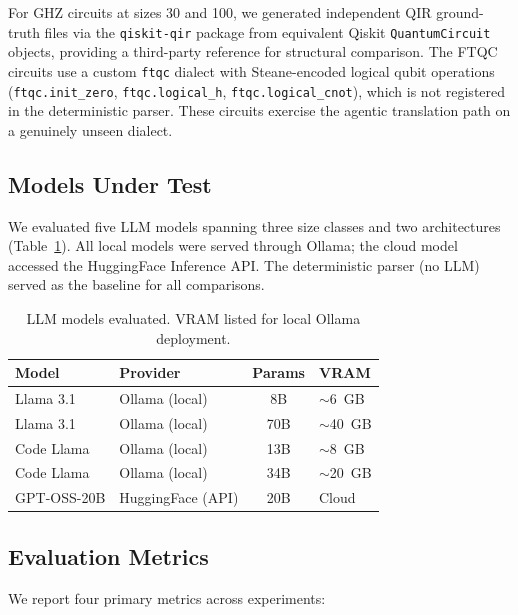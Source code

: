 \documentclass[conference]{IEEEtran}
\begin{document}
For GHZ circuits at sizes 30 and 100, we generated independent QIR ground-truth files via the \texttt{qiskit-qir} package from equivalent Qiskit \texttt{QuantumCircuit} objects, providing a third-party reference for structural comparison. The FTQC circuits use a custom \texttt{ftqc} dialect with Steane-encoded logical qubit operations (\texttt{ftqc.init\_zero}, \texttt{ftqc.logical\_h}, \texttt{ftqc.logical\_cnot}), which is not registered in the deterministic parser. These circuits exercise the agentic translation path on a genuinely unseen dialect.


\subsection{Models Under Test}

We evaluated five LLM models spanning three size classes and two architectures (Table~\ref{tab:models}). All local models were served through Ollama; the cloud model accessed the HuggingFace Inference API. The deterministic parser (no LLM) served as the baseline for all comparisons.

\begin{table}[htbp]
\centering
\caption{LLM models evaluated. VRAM listed for local Ollama deployment.}
\label{tab:models}
\renewcommand{\arraystretch}{1.1}
\begin{tabular}{@{}llcl@{}}
\toprule
\textbf{Model} & \textbf{Provider} & \textbf{Params} & \textbf{VRAM} \\
\midrule
Llama 3.1      & Ollama (local)     & 8B   & $\sim$6~GB  \\
Llama 3.1      & Ollama (local)     & 70B  & $\sim$40~GB \\
Code Llama     & Ollama (local)     & 13B  & $\sim$8~GB  \\
Code Llama     & Ollama (local)     & 34B  & $\sim$20~GB \\
GPT-OSS-20B    & HuggingFace (API)  & 20B  & Cloud       \\
\bottomrule
\end{tabular}
\end{table}
\subsection{Evaluation Metrics}

We report four primary metrics across experiments:
\end{document}
